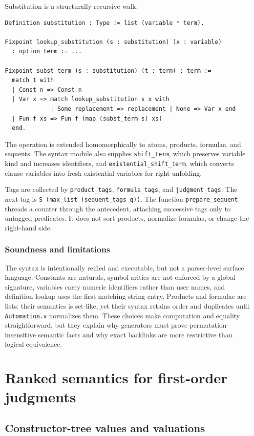 \documentclass[11pt,oneside]{book}
\DeclareRobustCommand{\code}[1]{\nolinkurl{#1}}
\DeclareRobustCommand{\file}[1]{\nolinkurl{#1}}
\newcommand{\soundlim}{\subsection*{Soundness and limitations}}
\begin{document}
Substitution is a structurally recursive walk:
\begin{lstlisting}[caption={First-match substitutions and their action on terms.}]
Definition substitution : Type := list (variable * term).

Fixpoint lookup_substitution (s : substitution) (x : variable)
  : option term := ...

Fixpoint subst_term (s : substitution) (t : term) : term :=
  match t with
  | Const n => Const n
  | Var x => match lookup_substitution s x with
             | Some replacement => replacement | None => Var x end
  | Fun f xs => Fun f (map (subst_term s) xs)
  end.
\end{lstlisting}
The operation is extended homomorphically to atoms, products, formulae, and
sequents.  The syntax module also supplies \code{shift_term}, which preserves
variable kind and increases identifiers, and \code{existential_shift_term},
which converts clause variables into fresh existential variables for right
unfolding.

Tags are collected by \code{product_tags}, \code{formula_tags}, and
\code{judgment_tags}.  The next tag is
\code{S (max_list (sequent_tags q))}.  The function \code{prepare_sequent}
threads a counter through the antecedent, attaching successive tags only to
untagged predicates.  It does not sort products, normalize formulas, or change
the right-hand side.

\soundlim

The syntax is intentionally reified and executable, but not a parser-level
surface language.  Constants are naturals, symbol arities are not enforced by
a global signature, variables carry numeric identifiers rather than user
names, and definition lookup uses the first matching string entry.  Products
and formulae are lists: their semantics is set-like, yet their syntax retains
order and duplicates until \file{Automation.v} normalizes them.  These choices
make computation and equality straightforward, but they explain why generators
must prove permutation-insensitive semantic facts and why exact backlinks are
more restrictive than logical equivalence.

\chapter{Ranked semantics for first-order judgments}
\label{ch:semantics}

\section{Constructor-tree values and valuations}
\end{document}
